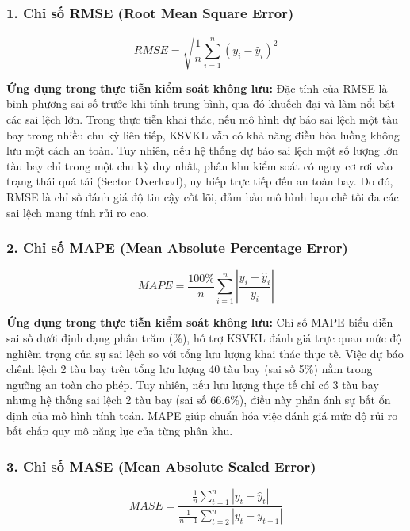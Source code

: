 \documentclass[12pt,a4paper]{article}
\begin{document}
\subsubsection{1. Chỉ số RMSE (Root Mean Square Error)}
\begin{equation}
RMSE = \sqrt{\frac{1}{n}\sum_{i=1}^{n}(y_i - \hat{y}_i)^2}
\end{equation}

\textbf{Ứng dụng trong thực tiễn kiểm soát không lưu:} 
Đặc tính của RMSE là bình phương sai số trước khi tính trung bình, qua đó khuếch đại và làm nổi bật các sai lệch lớn. Trong thực tiễn khai thác, nếu mô hình dự báo sai lệch một tàu bay trong nhiều chu kỳ liên tiếp, KSVKL vẫn có khả năng điều hòa luồng không lưu một cách an toàn. Tuy nhiên, nếu hệ thống dự báo sai lệch một số lượng lớn tàu bay chỉ trong một chu kỳ duy nhất, phân khu kiểm soát có nguy cơ rơi vào trạng thái quá tải (Sector Overload), uy hiếp trực tiếp đến an toàn bay. Do đó, RMSE là chỉ số đánh giá độ tin cậy cốt lõi, đảm bảo mô hình hạn chế tối đa các sai lệch mang tính rủi ro cao.

\subsubsection{2. Chỉ số MAPE (Mean Absolute Percentage Error)}
\begin{equation}
MAPE = \frac{100\%}{n}\sum_{i=1}^{n}\left|\frac{y_i - \hat{y}_i}{y_i}\right|
\end{equation}

\textbf{Ứng dụng trong thực tiễn kiểm soát không lưu:}
Chỉ số MAPE biểu diễn sai số dưới định dạng phần trăm (\%), hỗ trợ KSVKL đánh giá trực quan mức độ nghiêm trọng của sự sai lệch so với tổng lưu lượng khai thác thực tế. Việc dự báo chênh lệch 2 tàu bay trên tổng lưu lượng 40 tàu bay (sai số 5\%) nằm trong ngưỡng an toàn cho phép. Tuy nhiên, nếu lưu lượng thực tế chỉ có 3 tàu bay nhưng hệ thống sai lệch 2 tàu bay (sai số 66.6\%), điều này phản ánh sự bất ổn định của mô hình tính toán. MAPE giúp chuẩn hóa việc đánh giá mức độ rủi ro bất chấp quy mô năng lực của từng phân khu.

\subsubsection{3. Chỉ số MASE (Mean Absolute Scaled Error)}
\begin{equation}
MASE = \frac{\frac{1}{n}\sum_{t=1}^{n}|y_t - \hat{y}_t|}{\frac{1}{n-1}\sum_{t=2}^{n}|y_t - y_{t-1}|}
\end{equation}
\end{document}
